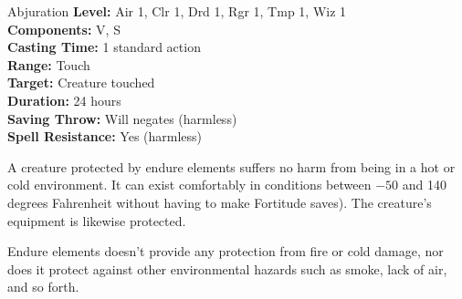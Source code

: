 {Abjuration}
{
	\textbf{Level:}
	Air 1, Clr 1, Drd 1, Rgr 1, Tmp 1, Wiz 1\\
	\textbf{Components:}
	V, S\\
	\textbf{Casting Time:}
	1 standard action\\
	\textbf{Range:}
	Touch\\
	\textbf{Target:}
	Creature touched\\
	\textbf{Duration:}
	24 hours\\
	\textbf{Saving Throw:}
	Will negates (harmless)\\
	\textbf{Spell Resistance:}
	Yes (harmless)\\
}
{
	A creature protected by endure elements suffers no harm from being in a hot or cold environment. It can exist comfortably in conditions between $-50$ and 140 degrees Fahrenheit without having to make Fortitude saves). The creature's equipment is likewise protected.

	Endure elements doesn't provide any protection from fire or cold damage, nor does it protect against other environmental hazards such as smoke, lack of air, and so forth.

}
